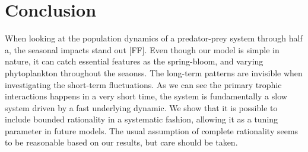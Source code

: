 \section*{Conclusion} %
When looking at the population dynamics of a predator-prey system through half a, the seasonal impacts stand out [FF]. Even though our model is simple in nature, it can catch essential features as the spring-bloom, and varying phytoplankton throughout the seaonss.  The long-term patterns are invisible when investigating the short-term fluctuations. As we can see the primary trophic interactions happens in a very short time, the system is fundamentally a slow system driven by a fast underlying dynamic.
We show that it is possible to include bounded rationality in a systematic fashion, allowing it as a tuning parameter in future models. The usual assumption of complete rationality seems to be reasonable based on our results, but care should be taken.
